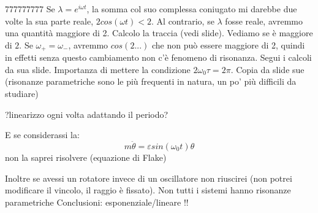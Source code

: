 \documentclass[a4paper,openany]{article}
\begin{document}
	777777777
	Se $\lambda = e^{i\omega t}$, la somma col suo complessa coniugato mi darebbe due volte la sua parte reale, $2cos(\omega t) < 2$. Al contrario, se $\lambda$ fosse reale, avremmo una quantità maggiore di 2. Calcolo la traccia (vedi slide). Vediamo se è maggiore di $2$. Se $\omega_{+} = \omega_{-}$, avremmo $cos(2...)$ che non può essere maggiore di 2, quindi in effetti senza questo cambiamento non c'è fenomeno di risonanza. Segui i calcoli da sua slide. Importanza di mettere la condizione $2\omega_{0}\tau = 2\pi$. Copia da slide sue (risonanze parametriche sono le più frequenti in natura, un po' più difficili da studiare)
	
	?linearizzo ogni volta adattando il periodo?
	
	
	E se considerassi la:
	$$
	m\ddot{\theta} = \varepsilon sin(\omega_{0} t)\theta
	$$
	non la saprei risolvere (equazione di Flake)
	
	
	Inoltre se avessi un rotatore invece di un oscillatore non riuscirei (non potrei modificare il vincolo, il raggio è fissato). Non tutti i sistemi hanno risonanze parametriche
	Conclusioni: esponenziale/lineare !!
	
	
	\newpage
\end{document}
